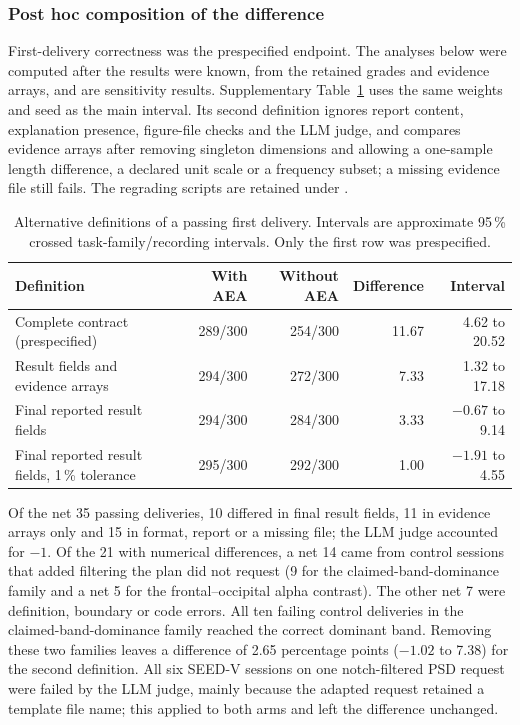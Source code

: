 \subsubsection*{Post hoc composition of the difference}

First-delivery correctness was the prespecified endpoint. The analyses below were computed after the results were known, from the retained grades and evidence arrays, and are sensitivity results. Supplementary Table~\ref*{tab:paired-composition} uses the same weights and seed as the main interval. Its second definition ignores report content, explanation presence, figure-file checks and the LLM judge, and compares evidence arrays after removing singleton dimensions and allowing a one-sample length difference, a declared unit scale or a frequency subset; a missing evidence file still fails. The regrading scripts are retained under .

\begin{table}[!htbp]
\centering\small
\caption{Alternative definitions of a passing first delivery. Intervals are approximate 95\,\% crossed task-family/recording intervals. Only the first row was prespecified.}
\label{tab:paired-composition}
\begin{tabular}{>{\raggedright\arraybackslash}p{6.4cm}rrrr}
\toprule
Definition & With AEA & Without AEA & Difference & Interval \\
\midrule
Complete contract (prespecified) & 289/300 & 254/300 & 11.67 & 4.62 to 20.52 \\
Result fields and evidence arrays & 294/300 & 272/300 & 7.33 & 1.32 to 17.18 \\
Final reported result fields & 294/300 & 284/300 & 3.33 & \(-0.67\) to 9.14 \\
Final reported result fields, 1\,\% tolerance & 295/300 & 292/300 & 1.00 & \(-1.91\) to 4.55 \\
\bottomrule
\end{tabular}
\end{table}

Of the net 35 passing deliveries, 10 differed in final result fields, 11 in evidence arrays only and 15 in format, report or a missing file; the LLM judge accounted for \(-1\). Of the 21 with numerical differences, a net 14 came from control sessions that added filtering the plan did not request (9 for the claimed-band-dominance family and a net 5 for the frontal--occipital alpha contrast). The other net 7 were definition, boundary or code errors. All ten failing control deliveries in the claimed-band-dominance family reached the correct dominant band. Removing these two families leaves a difference of 2.65 percentage points (\(-1.02\) to 7.38) for the second definition. All six SEED-V sessions on one notch-filtered PSD request were failed by the LLM judge, mainly because the adapted request retained a template file name; this applied to both arms and left the difference unchanged.

